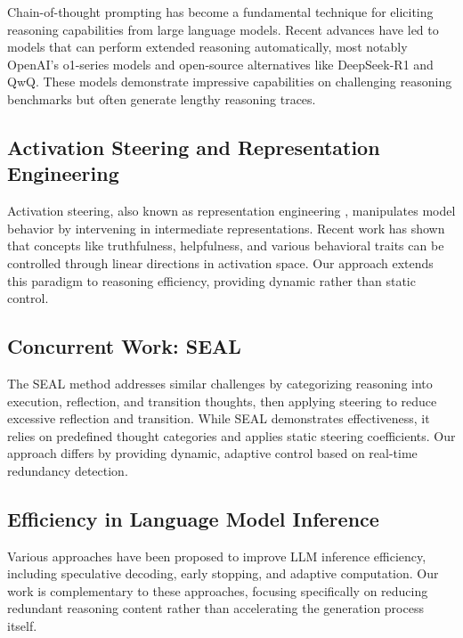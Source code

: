 \documentclass{article}
\begin{document}
Chain-of-thought prompting \citep{wei2022chain} has become a fundamental technique for eliciting reasoning capabilities from large language models. Recent advances have led to models that can perform extended reasoning automatically, most notably OpenAI's o1-series models \citep{openai2024learning} and open-source alternatives like DeepSeek-R1 \citep{guo2025deepseek} and QwQ. These models demonstrate impressive capabilities on challenging reasoning benchmarks but often generate lengthy reasoning traces.

\subsection{Activation Steering and Representation Engineering}

Activation steering, also known as representation engineering \citep{zou2023representation}, manipulates model behavior by intervening in intermediate representations. Recent work has shown that concepts like truthfulness, helpfulness, and various behavioral traits can be controlled through linear directions in activation space. Our approach extends this paradigm to reasoning efficiency, providing dynamic rather than static control.

\subsection{Concurrent Work: SEAL}

The SEAL method \citep{chen2025seal} addresses similar challenges by categorizing reasoning into execution, reflection, and transition thoughts, then applying steering to reduce excessive reflection and transition. While SEAL demonstrates effectiveness, it relies on predefined thought categories and applies static steering coefficients. Our approach differs by providing dynamic, adaptive control based on real-time redundancy detection.

\subsection{Efficiency in Language Model Inference}

Various approaches have been proposed to improve LLM inference efficiency, including speculative decoding, early stopping, and adaptive computation. Our work is complementary to these approaches, focusing specifically on reducing redundant reasoning content rather than accelerating the generation process itself.
\end{document}
